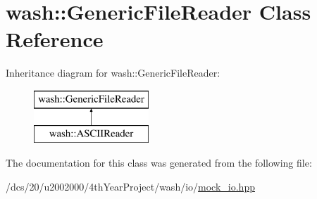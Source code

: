 \hypertarget{classwash_1_1GenericFileReader}{}\section{wash\+:\+:Generic\+File\+Reader Class Reference}
\label{classwash_1_1GenericFileReader}
Inheritance diagram for wash\+:\+:Generic\+File\+Reader\+:\begin{figure}[H]
\begin{center}
\leavevmode
\includegraphics[height=2.000000cm]{classwash_1_1GenericFileReader}
\end{center}
\end{figure}


The documentation for this class was generated from the following file\+:\begin{DoxyCompactItemize}
\item 
/dcs/20/u2002000/4th\+Year\+Project/wash/io/\mbox{\hyperlink{mock__io_8hpp}{mock\+\_\+io.\+hpp}}\end{DoxyCompactItemize}
